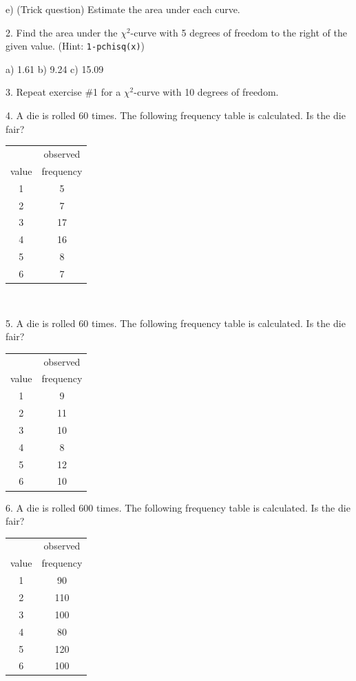 \documentclass[10pt]{article}
\newcommand{\Z}{\hphantom{0}}
\begin{document}
\hspace{20pt} e) (Trick question) Estimate the area under each curve.
\bigskip

2. Find the area under the $\chi^2$-curve with 5 degrees of freedom to the right of
the given value. (Hint:  \lstinline!1-pchisq(x)!)

\hspace{20pt} a) 1.61\hspace{40pt} b) 9.24 \hspace{40pt} c) 15.09
\vspace{.25in}

3. Repeat exercise \#1 for a $\chi^2$-curve with 10 degrees of freedom.
\vspace{.4in}

4. A die is rolled 60 times.  The following frequency table is calculated.
Is the die fair? 

\begin{tabular}{|c|c|}\hline
      & observed\\
value & frequency\\\hline
1 & \Z5\\
2 & \Z7\\
3 & 17\\
4 & 16\\
5 & \Z8\\
6 & \Z7\\\hline
\end{tabular}

\vfill
\eject
{\ }

5. A die is rolled 60 times.  The following frequency table is calculated.
Is the die fair? 

\begin{tabular}{|c|c|}\hline
      & observed\\
value & frequency\\\hline
1 & \Z9\\
2 & 11\\
3 & 10\\
4 & \Z8\\
5 & 12\\
6 & 10\\\hline
\end{tabular}
\bigskip
\bigskip

6. A die is rolled 600 times.  The following frequency table is calculated.
Is the die fair? 

\begin{tabular}{|c|c|}\hline
      & observed\\
value & frequency\\\hline
1 & \Z90\\
2 & 110\\
3 & 100\\
4 & \Z80\\
5 & 120\\
6 & 100\\\hline
\end{tabular}
\bigskip
\bigskip
\end{document}
